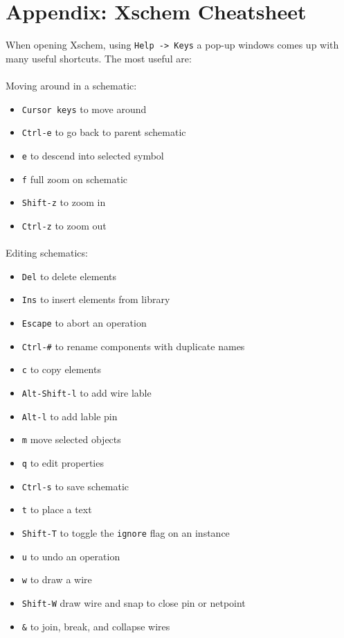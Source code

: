 \documentclass[
  a4paper,
  DIV=11,
  numbers=noendperiod]{scrartcl}
\makeatletter
\let\oldparagraph\paragraph
\renewcommand{\paragraph}{
    \@ifstar
      \xxxParagraphStar
      \xxxParagraphNoStar
  }
\newcommand{\xxxParagraphStar}[1]{\oldparagraph*{#1}\mbox{}}
\newcommand{\xxxParagraphNoStar}[1]{\oldparagraph{#1}\mbox{}}
\providecommand{\tightlist}{%
  \setlength{\itemsep}{0pt}\setlength{\parskip}{0pt}}\usepackage{longtable,booktabs,array}
\makeatother
\begin{document}
\section{Appendix: Xschem Cheatsheet}\label{appendix-xschem-cheatsheet}

When opening Xschem, using \texttt{Help\ -\textgreater{}\ Keys} a pop-up
windows comes up with many useful shortcuts. The most useful are:

\paragraph{Moving around in a
schematic:}\label{moving-around-in-a-schematic}

\begin{itemize}
\tightlist
\item
  \texttt{Cursor\ keys} to move around
\item
  \texttt{Ctrl-e} to go back to parent schematic
\item
  \texttt{e} to descend into selected symbol
\item
  \texttt{f} full zoom on schematic
\item
  \texttt{Shift-z} to zoom in
\item
  \texttt{Ctrl-z} to zoom out
\end{itemize}

\paragraph{Editing schematics:}\label{editing-schematics}

\begin{itemize}
\tightlist
\item
  \texttt{Del} to delete elements
\item
  \texttt{Ins} to insert elements from library
\item
  \texttt{Escape} to abort an operation
\item
  \texttt{Ctrl-\#} to rename components with duplicate names
\item
  \texttt{c} to copy elements
\item
  \texttt{Alt-Shift-l} to add wire lable
\item
  \texttt{Alt-l} to add lable pin
\item
  \texttt{m} move selected objects
\item
  \texttt{q} to edit properties
\item
  \texttt{Ctrl-s} to save schematic
\item
  \texttt{t} to place a text
\item
  \texttt{Shift-T} to toggle the \texttt{ignore} flag on an instance
\item
  \texttt{u} to undo an operation
\item
  \texttt{w} to draw a wire
\item
  \texttt{Shift-W} draw wire and snap to close pin or netpoint
\item
  \texttt{\&} to join, break, and collapse wires
\end{itemize}
\end{document}

